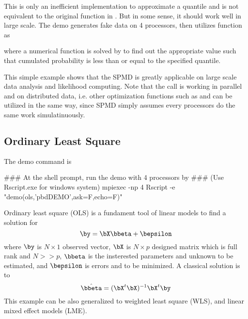 This is only an inefficient implementation to approximate a quantile
and is not equivalent to the original  function in
. But in some sense, it should work well in large scale.
The demo  generates fake data on 4 processors, then
utilizes  function as
where a numerical function is solved by  to find out
the appropriate value such that cumulated probability is less than
or equal to the specified quantile.

This simple example shows that the SPMD is greatly applicable on large
scale data analysis and likelihood computing.
Note that the  call is working in parallel and on distributed
data, i.e. other optimization functions such as  and 
can be utilized in the same way,
since SPMD simply assumes every processors do the same work
simulatinuously.




\subsection[Ordinary Least Square]{Ordinary Least Square}
\label{sec:ols}

The demo command is
\begin{Command}
### At the shell prompt, run the demo with 4 processors by
### (Use Rscript.exe for windows system)
mpiexec -np 4 Rscript -e "demo(ols,'pbdDEMO',ask=F,echo=F)"
\end{Command}

Ordinary least square (OLS)
is a fundament tool of linear models to find a solution for
$$\by = \bX\bbeta + \bepsilon$$
where $\by$ is $N\times 1$ observed vector,
$\bX$ is $N\times p$ designed matrix which is full rank and $N >> p$,
$\bbeta$ is the insterested parameters and unknown to be estimated,
and $\bepsilon$ is errors and to be minimized.
A classical solution is to
$$
\hat{\bbeta} = (\bX^t\bX)^{-1}\bX^t\by
$$
This example can be also generalized to weighted least square (WLS),
and linear mixed effect models (LME).

